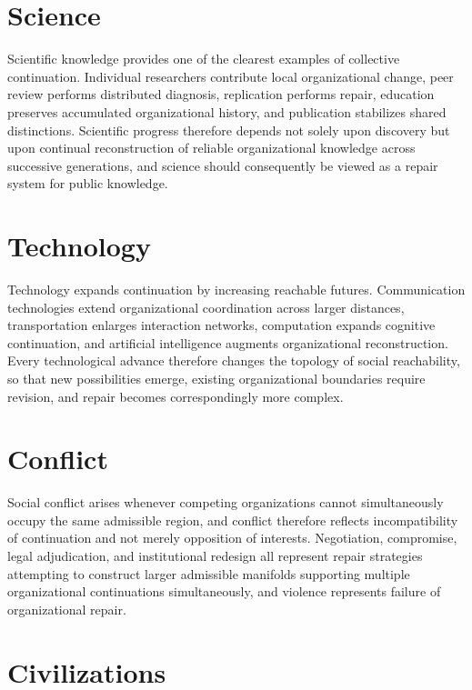 \documentclass[11pt,oneside]{book}
\numberwithin{equation}{chapter}
\theoremstyle{definition}
\theoremstyle{plain}
\begin{document}
\section{Science}

Scientific knowledge provides one of the clearest examples of collective continuation. Individual researchers contribute local organizational change, peer review performs distributed diagnosis, replication performs repair, education preserves accumulated organizational history, and publication stabilizes shared distinctions. Scientific progress therefore depends not solely upon discovery but upon continual reconstruction of reliable organizational knowledge across successive generations, and science should consequently be viewed as a repair system for public knowledge.

\section{Technology}

Technology expands continuation by increasing reachable futures. Communication technologies extend organizational coordination across larger distances, transportation enlarges interaction networks, computation expands cognitive continuation, and artificial intelligence augments organizational reconstruction. Every technological advance therefore changes the topology of social reachability, so that new possibilities emerge, existing organizational boundaries require revision, and repair becomes correspondingly more complex.

\section{Conflict}

Social conflict arises whenever competing organizations cannot simultaneously occupy the same admissible region, and conflict therefore reflects incompatibility of continuation and not merely opposition of interests. Negotiation, compromise, legal adjudication, and institutional redesign all represent repair strategies attempting to construct larger admissible manifolds supporting multiple organizational continuations simultaneously, and violence represents failure of organizational repair.

\section{Civilizations}
\end{document}
